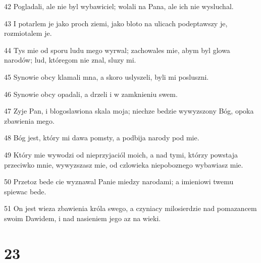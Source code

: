 \par 42 Pogladali, ale nie byl wybawiciel; wolali na Pana, ale ich nie wysluchal.
\par 43 I potarlem je jako proch ziemi, jako bloto na ulicach podeptawszy je, rozmiotalem je.
\par 44 Tys mie od sporu ludu mego wyrwal; zachowales mie, abym byl glowa narodów; lud, któregom nie znal, sluzy mi.
\par 45 Synowie obcy klamali mna, a skoro uslyszeli, byli mi posluszni.
\par 46 Synowie obcy opadali, a drzeli i w zamknieniu swem.
\par 47 Zyje Pan, i blogoslawiona skala moja; niechze bedzie wywyzszony Bóg, opoka zbawienia mego.
\par 48 Bóg jest, który mi dawa pomsty, a podbija narody pod mie.
\par 49 Który mie wywodzi od nieprzyjaciól moich, a nad tymi, którzy powstaja przeciwko mnie, wywyzszasz mie, od czlowieka niepoboznego wybawiasz mie.
\par 50 Przetoz bede cie wyznawal Panie miedzy narodami; a imieniowi twemu spiewac bede.
\par 51 On jest wieza zbawienia króla swego, a czyniacy milosierdzie nad pomazancem swoim Dawidem, i nad nasieniem jego az na wieki.

\chapter{23}

